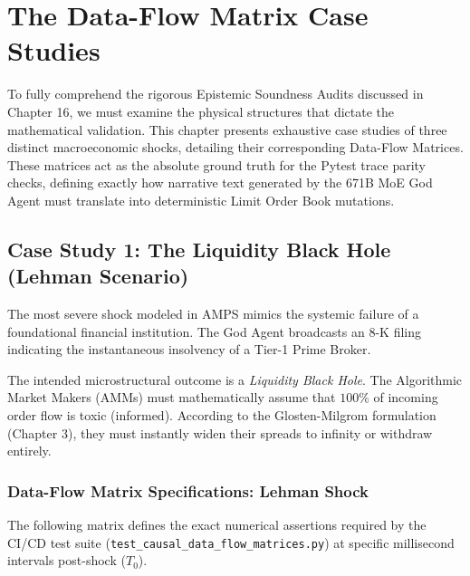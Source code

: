 \chapter{The Data-Flow Matrix Case Studies}
\label{ch:data_flow_case_studies}

To fully comprehend the rigorous Epistemic Soundness Audits discussed in Chapter 16, we must examine the physical structures that dictate the mathematical validation. This chapter presents exhaustive case studies of three distinct macroeconomic shocks, detailing their corresponding Data-Flow Matrices. These matrices act as the absolute ground truth for the Pytest trace parity checks, defining exactly how narrative text generated by the 671B MoE God Agent must translate into deterministic Limit Order Book mutations.

\section{Case Study 1: The Liquidity Black Hole (Lehman Scenario)}

The most severe shock modeled in AMPS mimics the systemic failure of a foundational financial institution. The God Agent broadcasts an 8-K filing indicating the instantaneous insolvency of a Tier-1 Prime Broker. 

The intended microstructural outcome is a \textit{Liquidity Black Hole}. The Algorithmic Market Makers (AMMs) must mathematically assume that $100\%$ of incoming order flow is toxic (informed). According to the Glosten-Milgrom formulation (Chapter 3), they must instantly widen their spreads to infinity or withdraw entirely.

\subsection{Data-Flow Matrix Specifications: Lehman Shock}

The following matrix defines the exact numerical assertions required by the CI/CD test suite (\texttt{test\_causal\_data\_flow\_matrices.py}) at specific millisecond intervals post-shock ($T_0$).

